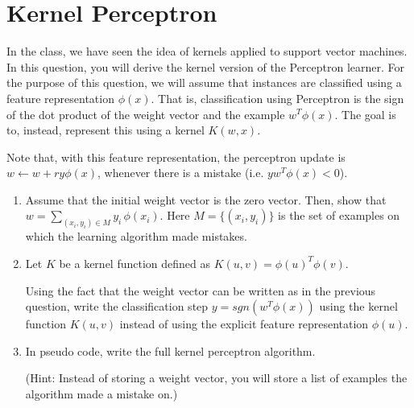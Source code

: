 \section{Kernel Perceptron}

In the class, we have seen the idea of kernels applied to support
vector machines.
%
In this question, you will derive the kernel version of the Perceptron
learner. For the purpose of this question, we will assume that
instances are classified using a feature representation $\phi(x)$.
That is, classification using Perceptron is the sign of the dot
product of the weight vector and the example $w^T\phi(x)$. The goal is
to, instead, represent this using a kernel $K(w, x)$.

Note that, with this feature representation, the perceptron update is
$w \leftarrow w + r y \phi(x)$, whenever there is a mistake (i.e.
$yw^T\phi(x) < 0$). 

\begin{enumerate}
\item Assume that the initial weight vector is the zero vector. Then,
  show that $w = \sum_{(x_i, y_i) \in M} y_i \, \phi(x_i)$. Here $M =
  \{(x_i, y_i)\}$ is the set of examples on which the learning
algorithm made mistakes.


\item Let $K$ be a kernel function defined as $K(u,v) = \phi(u)^T
  \phi(v)$.

  Using the fact that the weight vector can be written as in the
  previous question, write the classification step
  $y=sgn\left(w^T\phi(x)\right)$ using the kernel function $K(u,v)$
  instead of using the explicit feature representation $\phi(u)$.

\item In pseudo code, write the full kernel perceptron algorithm.

  (Hint: Instead of storing a weight vector, you will store a list of
  examples the algorithm made a mistake on.)
\end{enumerate}



